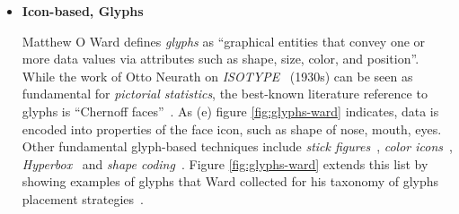 \begin{itemize}

\item \textbf{Icon-based, Glyphs}

Matthew O Ward \cite{ward02glyphs} defines \textit{glyphs} as ``graphical entities that convey one or more data values via attributes such as shape, size, color, and position''. While the work of Otto Neurath on \textit{ISOTYPE}~\cite{neurath} (1930s) can be seen as fundamental for \textit{pictorial statistics}, the best-known literature reference to glyphs is ``Chernoff faces''~\cite{chernoff73}. As (e) figure \ref{fig:glyphs-ward} indicates, data is encoded into properties of the face icon, such as shape of nose, mouth, eyes. Other fundamental glyph-based techniques include \textit{stick figures}~\cite{stickfigures}, \textit{color icons}~\cite{coloricons}, \textit{Hyperbox}~\cite{hyperbox} and \textit{shape coding}~\cite{shapecoding}. Figure \ref{fig:glyphs-ward} extends this list by showing examples of glyphs that Ward collected for his taxonomy of glyphs placement strategies~\cite{ward02glyphs}.


\end{itemize}
